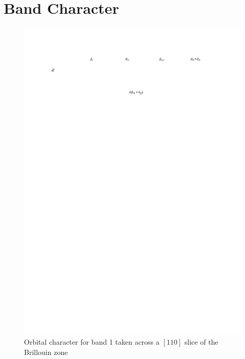
\chapter{\BaFeP Band Character}
\label{Appendix:BandCharacter110Slices}

\begin{figure}[h!]
    \begin{center}
        \includegraphics[scale=0.7]{Chapter-dHvABaFe2P2/Figures/AngleDepMeasurements/BandCharacterPlot/Band1_110Slice_BandCharacter}
        \caption{Orbital character for band 1 taken across a $[110]$ slice of the Brillouin zone}
        \label{Fig:Appendix:BandCharacter110Band1}
    \end{center}
\end{figure}
